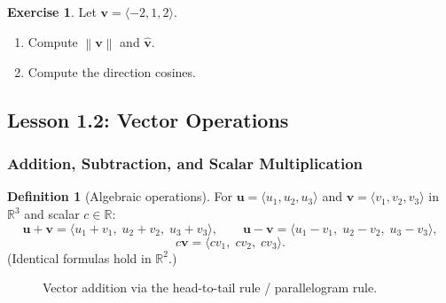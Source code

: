 \documentclass[12pt]{article}
\numberwithin{equation}{section}
\newcommand{\RR}{\mathbb{R}}
\newcommand{\vect}[1]{\boldsymbol{#1}}   %
\newcommand{\norm}[1]{\left\lVert #1\right\rVert}
\theoremstyle{plain}
\theoremstyle{definition}
\newtheorem{definition}[theorem]{Definition}
\newtheorem{exercise}[theorem]{Exercise}
\theoremstyle{remark}
\begin{document}
\begin{exercise}
Let $\vect{v}=\langle -2,1,2\rangle$.
\begin{enumerate}[label=(\alph*)]
\item Compute $\norm{\vect{v}}$ and $\hat{\vect{v}}$.
\item Compute the direction cosines.
\end{enumerate}
\end{exercise}


\subsection{Lesson 1.2: Vector Operations}

\subsubsection{Addition, Subtraction, and Scalar Multiplication}

\begin{definition}[Algebraic operations]
For $\vect{u}=\langle u_1,u_2,u_3\rangle$ and $\vect{v}=\langle v_1,v_2,v_3\rangle$ in $\RR^3$ and scalar $c\in\RR$:
\[
\vect{u}+\vect{v}=\langle u_1+v_1,\;u_2+v_2,\;u_3+v_3\rangle,\qquad
\vect{u}-\vect{v}=\langle u_1-v_1,\;u_2-v_2,\;u_3-v_3\rangle,
\]
\[
c\vect{v}=\langle cv_1,\;cv_2,\;cv_3\rangle.
\]
(Identical formulas hold in $\RR^2$.)
\end{definition}

\begin{figure}[H]
\centering
{}
\caption{Vector addition via the head-to-tail rule / parallelogram rule.}
\label{fig:addition}
\end{figure}
\end{document}

